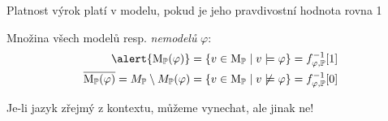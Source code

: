 \documentclass{beamer}
\begin{document}
\begin{frame}{Platnost}
    výrok platí v modelu, pokud je jeho pravdivostní hodnota rovna 1

    \pause
    \medskip


    \pause
    \medskip
    
    Množina všech modelů resp. \emph{nemodelů} $\varphi$:
    \begin{align*}
        \alert{\M_\mathbb P(\varphi)}&=\{v\in\M_\mathbb P\mid v\models \varphi\}=f_{\varphi,\mathbb P}^{-1}[1]\\
        \overline{\M_\mathbb P(\varphi)}=M_\mathbb P\setminus M_\mathbb P(\varphi)&=\{v\in\M_\mathbb P\mid v\not\models \varphi\}=f_{\varphi,\mathbb P}^{-1}[0]
    \end{align*}
    

    \pause
    Je-li jazyk zřejmý z kontextu, můžeme vynechat, ale jinak ne!

    
\end{frame}
\end{document}
